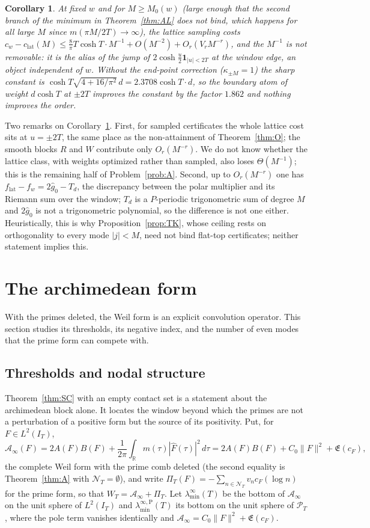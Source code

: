 \documentclass[11pt]{amsart}
\newtheorem{corollary}[theorem]{Corollary}
\theoremstyle{definition}
\theoremstyle{remark}
\newcommand{\R}{\mathbb R}
\newcommand{\PT}{\mathcal P_T}
\newcommand{\IT}{I_T}
\newcommand{\gh}[1]{\widehat g_{#1}}
\newcommand{\Fh}{\widehat F}
\newcommand{\cF}{c_F}
\newcommand{\Lev}{\mathfrak E}
\newcommand{\NT}{\mathcal N_T}
\newcommand{\Ainf}{\mathcal A_\infty}
\newcommand{\PiT}{\Pi_T}
\newcommand{\laminf}{\lambda^{\infty}_{\min}}
\newcommand{\laminfP}{\lambda^{\infty,\mathrm P}_{\min}}
\begin{document}
\begin{corollary}\label{cor:ALdef}
At fixed $w$ and for $M\ge M_0(w)$ (large enough that the second branch of the minimum in
Theorem~\ref{thm:AL} does not bind, which happens for all large $M$ since $m(\pi M/2T)\to\infty$),
the lattice sampling costs
$c_w-c_{\mathrm{lat}}(M)\le\frac8\pi T\cosh T\cdot M^{-1}+O(M^{-2})+O_r(V_rM^{-r})$, and the
$M^{-1}$ is not removable: it is the alias of the jump of $2\cosh\frac u2\mathbf 1_{|u|<2T}$ at the
window edge, an object independent of $w$. Without the end-point correction
\textup{(}$\kappa_{\pm M}=1$\textup{)} the sharp constant is
$\cosh T\sqrt{4+16/\pi^2}\,d=2.3708\cosh T\cdot d$, so the boundary atom of weight $d\cosh T$ at
$\pm2T$ improves the constant by the factor $1.862$ and nothing improves the order.
\end{corollary}

Two remarks on Corollary~\ref{cor:ALdef}. First, for sampled certificates the whole lattice cost
sits at $u=\pm2T$, the same place as the non-attainment of Theorem~\ref{thm:O}; the smooth blocks $R$
and $W$ contribute only $O_r(M^{-r})$. We do not know whether the lattice class, with weights
optimized rather than sampled, also loses $\Theta(M^{-1})$; this is the remaining half of
Problem~\ref{prob:A}. Second, up to $O_r(M^{-r})$ one has $f_{\mathrm{lat}}-f_w=2\gh0-T_d$, the
discrepancy between the polar multiplier and its Riemann sum over the window; $T_d$ is a
$P$-periodic trigonometric sum of degree $M$ and $2\gh0$ is not a trigonometric polynomial, so the
difference is not one either. Heuristically, this is why Proposition~\ref{prop:TK}, whose ceiling
rests on orthogonality to every mode $|j|<M$, need not bind flat-top certificates; neither
statement implies this.

\section{The archimedean form}\label{sec:archstr}

With the primes deleted, the Weil form is an explicit convolution operator. This section studies
its thresholds, its negative index, and the number of even modes that the prime form can compete
with.

\subsection{Thresholds and nodal structure}\label{subsec:arch}

Theorem~\ref{thm:SC} with an empty contact set is a statement about the archimedean block alone. It
locates the window beyond which the primes are not a perturbation of a positive form but the source
of its positivity. Put, for $F\in L^2(\IT)$,
\[
\Ainf(F)=2A(F)B(F)+\frac1{2\pi}\int_\R m(\tau)|\Fh(\tau)|^2\,d\tau
=2A(F)B(F)+C_0\|F\|^2+\Lev(\cF),
\]
the complete Weil form with the prime comb deleted (the second equality is Theorem~\ref{thm:A} with
$\NT=\emptyset$), and write $\PiT(F)=-\sum_{n\in\NT}v_n\cF(\log n)$ for the prime form, so that
$W_T=\Ainf+\PiT$. Let $\laminf(T)$ be the bottom of $\Ainf$ on the unit sphere of $L^2(\IT)$ and
$\laminfP(T)$ its bottom on the unit sphere of $\PT$, where the pole term vanishes identically and
$\Ainf=C_0\|F\|^2+\Lev(\cF)$.
\end{document}
